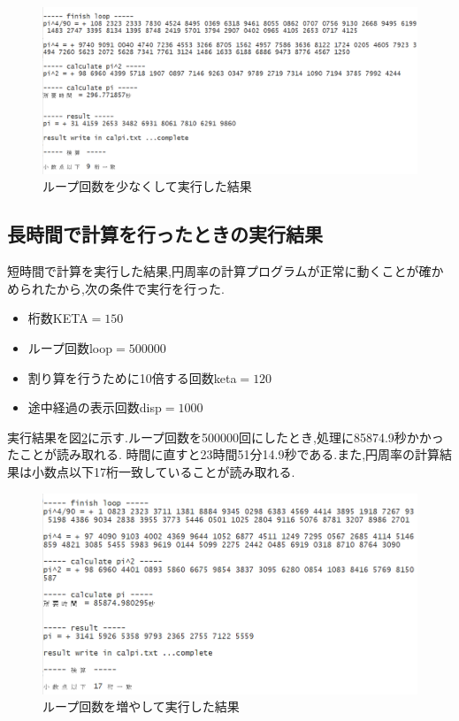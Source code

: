 \documentclass[a4j] {jarticle}
\begin{document}
      \begin{figure}[H]
        \centering
        \includegraphics[scale=0.8]{result1.png}
        \caption{ループ回数を少なくして実行した結果}
       \label{r1}
      \end{figure}


      \subsection{長時間で計算を行ったときの実行結果}
      短時間で計算を実行した結果,円周率の計算プログラムが正常に動くことが確かめられたから,次の条件で実行を行った.
    \begin{itemize}
        \item 桁数KETA$=150$
        \item ループ回数loop$=500000$
        \item 割り算を行うために10倍する回数keta$=120$
        \item 途中経過の表示回数disp$=1000$
      \end{itemize}

      実行結果を図\ref{r2}に示す.ループ回数を500000回にしたとき,処理に85874.9秒かかったことが読み取れる.
      時間に直すと23時間51分14.9秒である.また,円周率の計算結果は小数点以下17桁一致していることが読み取れる.

      \begin{figure}[H]
        \centering
        \includegraphics[scale=0.82]{result2.png}
        \caption{ループ回数を増やして実行した結果}
       \label{r2}
      \end{figure}
\end{document}
